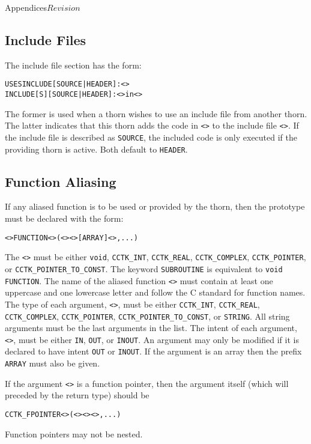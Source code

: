 \begin{cactuspart}{Appendices}{}{$Revision$}
\subsection{Include Files}
The include file section has the form:
\begin{alltt}
USES INCLUDE [SOURCE|HEADER]: <>
INCLUDE[S] [SOURCE|HEADER]: <> in <>
\end{alltt}
The former is used when a thorn wishes to use an include file from
another thorn.  The latter indicates that this thorn adds the code in
\texttt{<>} to the include file \texttt{<>}.  If
the include file is described as \verb|SOURCE|, the included code is
only executed if the providing thorn is active.
Both default to \verb|HEADER|.

\subsection{Function Aliasing}
\label{subsec:Appendix.interface.function_aliasing}
If any aliased function is to be used or provided by the thorn, then
the prototype must be declared with the form:
\begin{alltt}
<> FUNCTION <>(<> <> [ARRAY] <>, ...)
\end{alltt}
The \texttt{<>} must be either \verb|void|,
\verb|CCTK_INT|, \verb|CCTK_REAL|, \verb|CCTK_COMPLEX|,
\verb|CCTK_POINTER|, or \verb|CCTK_POINTER_TO_CONST|.  The keyword
\verb|SUBROUTINE| is equivalent to \verb|void FUNCTION|. The name of
the aliased function \texttt{<>} must contain at least one
uppercase and one lowercase letter and follow the C standard for
function names.  The type of each argument,
\texttt{<>}, must be either \verb|CCTK_INT|,
\verb|CCTK_REAL|, \verb|CCTK_COMPLEX|, \verb|CCTK_POINTER|,
\verb|CCTK_POINTER_TO_CONST|, or \verb|STRING|.  All string arguments
must be the last arguments in the list.  The intent of each argument,
\texttt{<>}, must be either \verb|IN|, \verb|OUT|, or
\verb|INOUT|.  An argument may only be modified if it is declared to
have intent \verb|OUT| or \verb|INOUT|.  If the argument is an array
then the prefix \verb|ARRAY| must also be given.

If the argument \texttt{<>} is a function pointer, then the argument
itself (which will preceded by the return type) should be
\begin{alltt}
CCTK_FPOINTER <>(<> <> <>, ...)
\end{alltt}
Function pointers may not be nested. 


\end{cactuspart}

